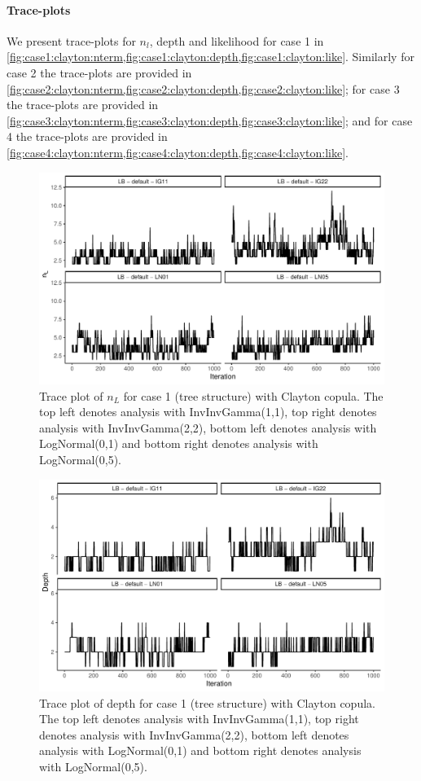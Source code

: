 \documentclass{amsart}
\begin{document}
\paragraph{Trace-plots} We present trace-plots for $n_l$, depth and likelihood for case 1 in \cref{fig:case1:clayton:nterm,fig:case1:clayton:depth,fig:case1:clayton:like}. Similarly for case 2 the trace-plots are provided in \cref{fig:case2:clayton:nterm,fig:case2:clayton:depth,fig:case2:clayton:like}; for case 3 the trace-plots are provided in \cref{fig:case3:clayton:nterm,fig:case3:clayton:depth,fig:case3:clayton:like}; and for case 4 the trace-plots are provided in \cref{fig:case4:clayton:nterm,fig:case4:clayton:depth,fig:case4:clayton:like}.


\begin{figure}
	\centering
	\includegraphics[width = 0.75\linewidth]{trace_case1_clayton_nterm.pdf}
	\caption{Trace plot of $n_L$ for case 1 (tree structure) with Clayton copula. The top left denotes analysis with InvInvGamma(1,1), top right denotes analysis with InvInvGamma(2,2), bottom left denotes analysis with LogNormal(0,1) and bottom right denotes analysis with LogNormal(0,5).}
	\label{fig:case1:clayton:nterm}
\end{figure}

\begin{figure}
	\centering
	\includegraphics[width = 0.75\linewidth]{trace_case1_clayton_depth.pdf}
	\caption{Trace plot of depth for case 1 (tree structure) with Clayton copula. The top left denotes analysis with InvInvGamma(1,1), top right denotes analysis with InvInvGamma(2,2), bottom left denotes analysis with LogNormal(0,1) and bottom right denotes analysis with LogNormal(0,5).}
	\label{fig:case1:clayton:depth}
\end{figure}
\end{document}
